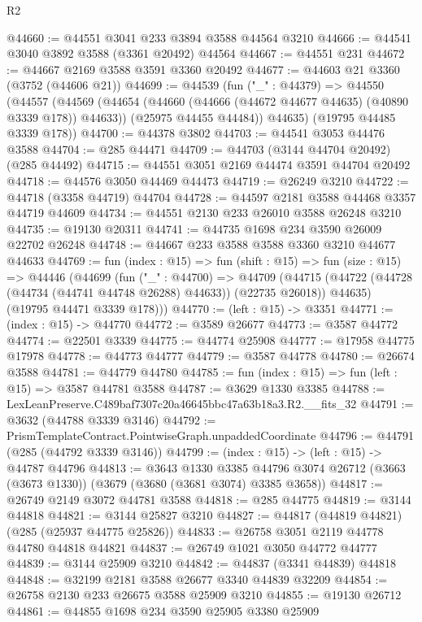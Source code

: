 \begin{lexlean}{R2}
\begin{coremodule}
@44660 := @44551 @3041 @233 @3894 @3588 @44564 @3210
@44666 := @44541 @3040 @3892 @3588 (@3361 @20492) @44564
@44667 := @44551 @231
@44672 := @44667 @2169 @3588 @3591 @3360 @20492
@44677 := @44603 @21 @3360 (@3752 (@44606 @21))
@44699 := @44539
    (fun ("_" : @44379) =>
    @44550
      (@44557
        (@44569
          (@44654 (@44660 (@44666 (@44672 @44677 @44635) (@40890 @3339 @178)) @44633))
          (@25975 @44455 @44484))
        @44635)
      (@19795 @44485 @3339 @178))
@44700 := @44378 @3802
@44703 := @44541 @3053 @44476 @3588
@44704 := @285 @44471
@44709 := @44703 (@3144 @44704 @20492) (@285 @44492)
@44715 := @44551 @3051 @2169 @44474 @3591 @44704 @20492
@44718 := @44576 @3050 @44469 @44473
@44719 := @26249 @3210
@44722 := @44718 (@3358 @44719) @44704
@44728 := @44597 @2181 @3588 @44468 @3357 @44719 @44609
@44734 := @44551 @2130 @233 @26010 @3588 @26248 @3210
@44735 := @19130 @20311
@44741 := @44735 @1698 @234 @3590 @26009 @22702 @26248
@44748 := @44667 @233 @3588 @3588 @3360 @3210 @44677 @44633
@44769 := fun (index : @15) =>
  fun (shift : @15) =>
  fun (size : @15) =>
  @44446
    (@44699
      (fun ("_" : @44700) =>
      @44709
        (@44715 (@44722 (@44728 (@44734 (@44741 @44748 @26288) @44633)) (@22735 @26018)) @44635)
        (@19795 @44471 @3339 @178)))
@44770 := (left : @15) -> @3351
@44771 := (index : @15) -> @44770
@44772 := @3589 @26677
@44773 := @3587 @44772
@44774 := @22501 @3339
@44775 := @44774 @25908
@44777 := @17958 @44775 @17978
@44778 := @44773 @44777
@44779 := @3587 @44778
@44780 := @26674 @3588
@44781 := @44779 @44780
@44785 := fun (index : @15) => fun (left : @15) => @3587 @44781 @3588
@44787 := @3629 @1330 @3385
@44788 := LexLeanPreserve.C489baf7307c20a46645bbc47a63b18a3.R2.__fits_32
@44791 := @3632 (@44788 @3339 @3146)
@44792 := PrismTemplateContract.PointwiseGraph.unpaddedCoordinate
@44796 := @44791 (@285 (@44792 @3339 @3146))
@44799 := (index : @15) -> (left : @15) -> @44787 @44796
@44813 := @3643
    @1330
    @3385
    @44796
    @3074
    @26712
    (@3663 (@3673 @1330))
    (@3679 (@3680 (@3681 @3074) @3385 @3658))
@44817 := @26749 @2149 @3072 @44781 @3588
@44818 := @285 @44775
@44819 := @3144 @44818
@44821 := @3144 @25827 @3210
@44827 := @44817 (@44819 @44821) (@285 (@25937 @44775 @25826))
@44833 := @26758 @3051 @2119 @44778 @44780 @44818 @44821
@44837 := @26749 @1021 @3050 @44772 @44777
@44839 := @3144 @25909 @3210
@44842 := @44837 (@3341 @44839) @44818
@44848 := @32199 @2181 @3588 @26677 @3340 @44839 @32209
@44854 := @26758 @2130 @233 @26675 @3588 @25909 @3210
@44855 := @19130 @26712
@44861 := @44855 @1698 @234 @3590 @25905 @3380 @25909

\end{coremodule}
\end{lexlean}
